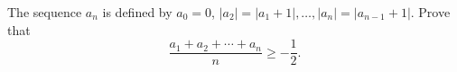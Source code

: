 The sequence $a_n$ is defined by $a_0 = 0$, $|a_2| = |a_1 + 1|, \ldots, |a_n| = |a_{n-1} + 1|$. Prove that
\[ \frac{a_1 + a_2 + \cdots + a_n}{n} \geq -\frac{1}{2}. \]
